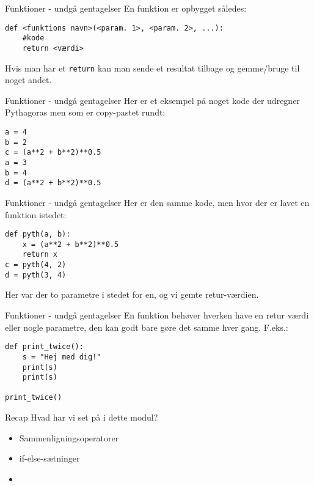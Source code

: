 \documentclass[main.tex]{subfiles}
\begin{document}
\begin{frame}[fragile]{Funktioner - undgå gentagelser}
En funktion er opbygget således:
\begin{lstlisting}[style=python]
def <funktions navn>(<param. 1>, <param. 2>, ...):
	#kode
	return <værdi>
\end{lstlisting}
Hvis man har et \texttt{return} kan man sende et resultat tilbage og gemme/bruge til noget andet.
\end{frame}


\begin{frame}[fragile]{Funktioner - undgå gentagelser}
	Her er et eksempel på noget kode der udregner Pythagoras men som er copy-pastet rundt:
	\begin{lstlisting}[style=python]
a = 4
b = 2
c = (a**2 + b**2)**0.5
a = 3
b = 4
d = (a**2 + b**2)**0.5
	\end{lstlisting}
\end{frame}

\begin{frame}[fragile]{Funktioner - undgå gentagelser}
	Her er den samme kode, men hvor der er lavet en funktion istedet:
	\begin{lstlisting}[style=python]
def pyth(a, b):
	x = (a**2 + b**2)**0.5
	return x
c = pyth(4, 2)
d = pyth(3, 4)
	\end{lstlisting}

	Her var der to parametre i stedet for en, og vi gemte retur-værdien.
\end{frame}


\begin{frame}[fragile]{Funktioner - undgå gentagelser}
	En funktion behøver hverken have en retur værdi eller nogle parametre, den kan godt bare gøre det samme hver gang. F.eks.:
	\begin{lstlisting}[style=python]
def print_twice():
	s = "Hej med dig!"
	print(s)
	print(s)
	
print_twice()
	\end{lstlisting}
\end{frame}


\begin{frame}[fragile]{Recap}
	Hvad har vi set på i dette modul?
	\begin{itemize}
		\item Sammenligningsoperatorer
		\item if-else-sætninger
		\item 
	\end{itemize}
\end{frame}
\end{document}
